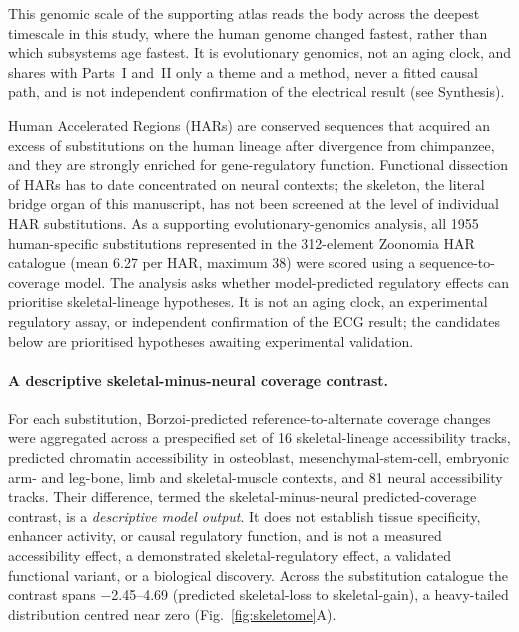 \documentclass[11pt]{article}
\begin{document}
This genomic scale of the supporting atlas reads the body across the deepest timescale in this
study, where the human genome changed fastest, rather than which subsystems age fastest. It is
evolutionary genomics, not an aging clock, and shares with Parts~I and~II only a theme and a
method, never a fitted causal path, and is not independent confirmation of the electrical result
(see Synthesis).


Human Accelerated
Regions (HARs) are conserved sequences that acquired an excess of substitutions on the human
lineage after divergence from chimpanzee, and they are strongly enriched for gene-regulatory
function. Functional dissection of HARs has to date concentrated on neural contexts; the
skeleton, the literal bridge organ of this manuscript, has not been screened at the level
of individual HAR substitutions. As a supporting evolutionary-genomics analysis, all
\num{1955} human-specific substitutions represented in the \num{312}-element Zoonomia HAR
catalogue \citep{keough2023hars} (mean \num{6.27} per HAR, maximum \num{38}) were scored using a
sequence-to-coverage model. The analysis asks whether model-predicted regulatory effects can
prioritise skeletal-lineage hypotheses. It is not an aging clock, an experimental regulatory
assay, or independent confirmation of the ECG result; the candidates below are prioritised
hypotheses awaiting experimental validation.

\paragraph{A descriptive skeletal-minus-neural coverage contrast.}
For each substitution, Borzoi-predicted \citep{linder2025borzoi} reference-to-alternate coverage
changes were aggregated across a prespecified set of \num{16} skeletal-lineage accessibility
tracks, predicted chromatin accessibility in osteoblast, mesenchymal-stem-cell, embryonic arm-
and leg-bone, limb and skeletal-muscle contexts, and \num{81} neural accessibility tracks.
Their difference, termed the skeletal-minus-neural predicted-coverage contrast, is a
\emph{descriptive model output}. It does not establish tissue specificity, enhancer activity, or
causal regulatory function, and is not a measured accessibility effect, a demonstrated
skeletal-regulatory effect, a validated functional variant, or a biological discovery. Across the
substitution catalogue the contrast spans \numrange{-2.45}{4.69} (predicted skeletal-loss to
skeletal-gain), a heavy-tailed distribution centred near zero (Fig.~\ref{fig:skeletome}A).
\end{document}
